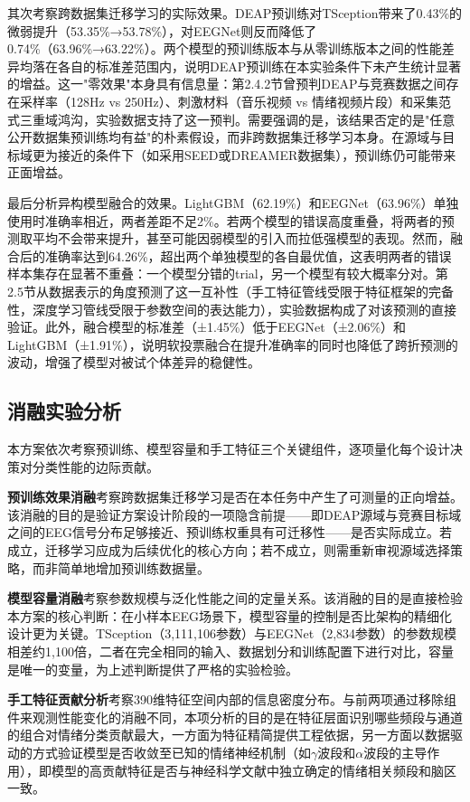 \documentclass[UTF8,zihao=-4,fontset=windows]{ctexart}
\numberwithin{equation}{section}
\numberwithin{figure}{section}
\numberwithin{table}{section}
\begin{document}
其次考察跨数据集迁移学习的实际效果。DEAP预训练对TSception带来了0.43\%的微弱提升（53.35\%→53.78\%），对EEGNet则反而降低了0.74\%（63.96\%→63.22\%）。两个模型的预训练版本与从零训练版本之间的性能差异均落在各自的标准差范围内，说明DEAP预训练在本实验条件下未产生统计显著的增益。这一"零效果"本身具有信息量：第2.4.2节曾预判DEAP与竞赛数据之间存在采样率（128Hz vs 250Hz）、刺激材料（音乐视频 vs 情绪视频片段）和采集范式三重域鸿沟，实验数据支持了这一预判。需要强调的是，该结果否定的是"任意公开数据集预训练均有益"的朴素假设，而非跨数据集迁移学习本身。在源域与目标域更为接近的条件下（如采用SEED或DREAMER数据集），预训练仍可能带来正面增益。

最后分析异构模型融合的效果。LightGBM（62.19\%）和EEGNet（63.96\%）单独使用时准确率相近，两者差距不足2\%。若两个模型的错误高度重叠，将两者的预测取平均不会带来提升，甚至可能因弱模型的引入而拉低强模型的表现。然而，融合后的准确率达到64.26\%，超出两个单独模型的各自最优值，这表明两者的错误样本集存在显著不重叠：一个模型分错的trial，另一个模型有较大概率分对。第2.5节从数据表示的角度预测了这一互补性（手工特征管线受限于特征框架的完备性，深度学习管线受限于参数空间的表达能力），实验数据构成了对该预测的直接验证。此外，融合模型的标准差（±1.45\%）低于EEGNet（±2.06\%）和LightGBM（±1.91\%），说明软投票融合在提升准确率的同时也降低了跨折预测的波动，增强了模型对被试个体差异的稳健性。

\subsection{消融实验分析}

本方案依次考察预训练、模型容量和手工特征三个关键组件，逐项量化每个设计决策对分类性能的边际贡献。

\textbf{预训练效果消融}考察跨数据集迁移学习是否在本任务中产生了可测量的正向增益。该消融的目的是验证方案设计阶段的一项隐含前提——即DEAP源域与竞赛目标域之间的EEG信号分布足够接近、预训练权重具有可迁移性——是否实际成立。若成立，迁移学习应成为后续优化的核心方向；若不成立，则需重新审视源域选择策略，而非简单地增加预训练数据量。

\textbf{模型容量消融}考察参数规模与泛化性能之间的定量关系。该消融的目的是直接检验本方案的核心判断：在小样本EEG场景下，模型容量的控制是否比架构的精细化设计更为关键。TSception（3,111,106参数）与EEGNet（2,834参数）的参数规模相差约1,100倍，二者在完全相同的输入、数据划分和训练配置下进行对比，容量是唯一的变量，为上述判断提供了严格的实验检验。

\textbf{手工特征贡献分析}考察390维特征空间内部的信息密度分布。与前两项通过移除组件来观测性能变化的消融不同，本项分析的目的是在特征层面识别哪些频段与通道的组合对情绪分类贡献最大，一方面为特征精简提供工程依据，另一方面以数据驱动的方式验证模型是否收敛至已知的情绪神经机制（如$\gamma$波段和$\alpha$波段的主导作用），即模型的高贡献特征是否与神经科学文献中独立确定的情绪相关频段和脑区一致。
\end{document}
